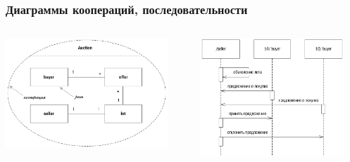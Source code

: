 \documentclass{../mcsslides}
\begin{document}
    \begin{frame}
        \frametitle{Диаграммы коопераций, последовательности}
        \begin{columns}
            \begin{column}{0.5\textwidth}
                \begin{center}
                    \includegraphics[width=0.9\textwidth]{cooperationDiagram.png}
                \end{center}
            \end{column}
            \begin{column}{0.5\textwidth}
                \begin{center}
                    \includegraphics[width=0.9\textwidth]{cooperationSequenceDiagram.png}
                \end{center}
            \end{column}
        \end{columns}
    \end{frame}
\end{document}
